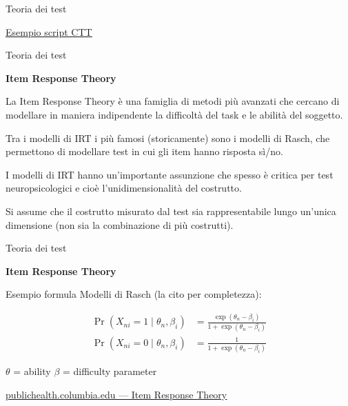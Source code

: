 \documentclass[
  ignorenonframetext,
  aspectratio=169,
]{beamer}
\begin{document}
\begin{frame}{Teoria dei test}
\label{teoria-dei-test-4}
\begin{center}
  \href{https://github.com/giorgioarcara/stat_forensic_neuropsy/blob/main/code/02_True_score.R}{\underline{Esempio script CTT}}
\end{center}
\end{frame}

\begin{frame}{Teoria dei test}
\label{teoria-dei-test-5}
\begin{center}
  \textbf{Item Response Theory}
\end{center}

La Item Response Theory è una famiglia di metodi più avanzati che
cercano di modellare in maniera indipendente la difficoltà del task e le
abilità del soggetto.

Tra i modelli di IRT i più famosi (storicamente) sono i modelli di
Rasch, che permettono di modellare test in cui gli item hanno risposta
sì/no. \pause

I modelli di IRT hanno un'importante assunzione che spesso è critica per
test neuropsicologici e cioè l'unidimensionalità del costrutto. \pause

Si assume che il costrutto misurato dal test sia rappresentabile lungo
un'unica dimensione (non sia la combinazione di più costrutti).
\end{frame}

\begin{frame}{Teoria dei test}
\label{teoria-dei-test-6}
\begin{center}
  \textbf{Item Response Theory}
\end{center}

Esempio formula Modelli di Rasch (la cito per completezza): \vspace{2em}

\small
\begin{align}
  \Pr(X_{ni}=1 \mid \theta_n, \beta_i)
  &= \frac{\exp(\theta_n - \beta_i)}{1 + \exp(\theta_n - \beta_i)}
  \label{eq:rasch_prob}
  \\
  \Pr(X_{ni}=0 \mid \theta_n, \beta_i) &= \frac{1}{1 + \exp(\theta_n - \beta_i)}
  \label{eq:rasch_prob0}
\end{align}

$\theta$ = ability
$\beta$ = difficulty parameter

\vspace{2em}

\href{https://www.publichealth.columbia.edu/research/population-health-methods/item-response-theory}{\ul{publichealth.columbia.edu
--- Item Response Theory}}
\end{frame}
\end{document}
